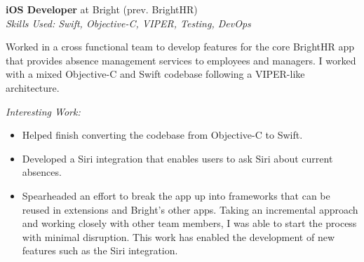 \textbf{iOS Developer} at Bright (prev. BrightHR) \\
\textit{Skills Used: Swift, Objective-C, VIPER, Testing, DevOps}

Worked in a cross functional team to develop features for the core BrightHR app
that provides absence management services to employees and managers. I worked
with a mixed Objective-C and Swift codebase following a VIPER-like architecture.

\medskip

\textit{Interesting Work:}

\smallskip

\begin{itemize}
\item Helped finish converting the codebase from Objective-C to Swift.

\item Developed a Siri integration that enables users to ask Siri about current absences.

\item Spearheaded an effort to break the app up into frameworks that can be
  reused in extensions and Bright's other apps. Taking an incremental approach
  and working closely with other team members, I was able to start the process
  with minimal disruption. This work has enabled the development of new features
  such as the Siri integration.

\end{itemize}


